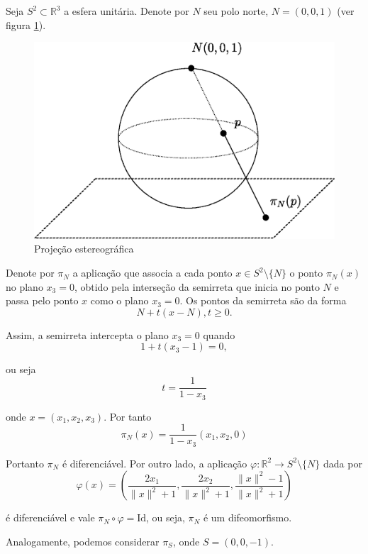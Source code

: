 \begin{exemplo}
Seja $S^2 \subset \mathbb{R}^3$ a esfera unitária. Denote por $N$ seu polo norte, $N = (0,0,1)$ (ver figura \ref{projecao_estereografica}).

\begin{figure}

	\centering
	\includegraphics[scale=0.5]{graficos/projecao_estereografica.eps}
	\caption{Projeção estereográfica}
	\label{projecao_estereografica}
\end{figure}

Denote por $\pi_N$ a aplicação que associa a cada ponto $x \in S^2 \setminus \{N\}$ o ponto $\pi_N(x)$ no plano $x_3 = 0$, obtido pela interseção da semirreta que inicia no ponto $N$ e passa pelo ponto $x$ como o plano $x_3 = 0$. Os pontos da semirreta são da forma
\begin{equation*}
    N + t(x - N), t \geq 0.
\end{equation*}

Assim, a semirreta intercepta o plano $x_3 = 0$ quando
\begin{equation*}
    1 + t(x_3 - 1) = 0,
\end{equation*}

ou seja
\begin{equation*}
    t = \frac{1}{1 - x_3}
\end{equation*}

onde $x = (x_1, x_2, x_3)$. Por tanto
\begin{equation*}
    \pi_N(x) = \frac{1}{1-x_3} (x_1, x_2, 0)
\end{equation*}

Portanto $\pi_N$ é diferenciável. Por outro lado, a aplicação $\varphi: \mathbb{R}^2 \rightarrow S^2 \setminus \{N\}$ dada por
\begin{equation*}
	\varphi(x) = \left( \frac{2x_1}{\|x\|^2 + 1}, \frac{2x_2}{\|x\|^2 +1}, \frac{\|x\|^2 -1}{\|x\|^2 +1} \right)
\end{equation*} 

é diferenciável e vale $\pi_N \circ \varphi = \text{Id}$, ou seja, $\pi_N$ é um difeomorfismo.

Analogamente, podemos considerar $\pi_S$, onde $S=(0,0,-1)$.
\end{exemplo}

